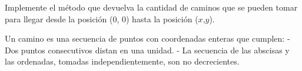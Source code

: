 Implemente el método que devuelva la cantidad de caminos que se pueden tomar para llegar desde la posición (0, 0) hasta la posición ($x$,$y$).

Un camino es una secuencia de puntos con coordenadas enteras que cumplen:
- Dos puntos consecutivos distan en una unidad.
- La secuencia de las abscisas y las ordenadas, tomadas independientemente, son no decrecientes.
